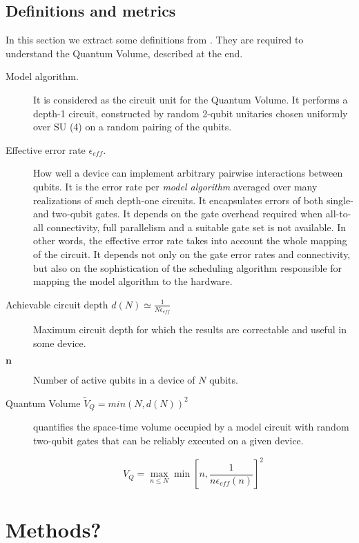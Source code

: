 \documentclass[11pt]{article}
\begin{document}
\subsection{Definitions and metrics}
\label{sec:orgda1eff5}

In this section we extract some definitions from \cite{Bishop_2017,Moll_2018}. 
They are required to understand the Quantum Volume, described at the end.

\begin{description}
\item[{Model algorithm.}] It is considered as the circuit unit for the Quantum Volume. It performs a depth-1 circuit, constructed by random 2-qubit unitaries chosen uniformly over SU (4) on a random pairing of the qubits.

\item[{Effective error rate \(\epsilon_{eff}\).}] How well a device can implement arbitrary pairwise interactions between qubits. It is the error rate per \emph{model algorithm} averaged over many realizations of such depth-one circuits. It encapsulates errors of both single- and two-qubit gates. It depends on the gate overhead required when all-to-all connectivity, full parallelism and a suitable gate set is not available. In other words, the effective error rate takes into account the whole mapping of the circuit. It depends not only on the gate error rates and connectivity, but also on the sophistication of the scheduling algorithm responsible for mapping the model algorithm to the hardware.

\item[{Achievable circuit depth \(d(N) \simeq \frac{1}{N \epsilon_{eff}}\)}] Maximum circuit depth for which the results are correctable and useful in some device.
\end{description}

\begin{description}
\item[{\(\textbf{n}\)}] Number of active qubits in a device of \(N\) qubits.

\item[{Quantum Volume \(\tilde{V}_Q = min (N, d(N))^2\)}] quantifies the space-time volume occupied by a model circuit with random two-qubit gates that can be reliably executed on a given device.

$$V_Q = \max_{n \le N} \min \left[ n,\frac{1}{n \epsilon_{eff} (n)}\right]^2$$
\end{description}

\section{Methods?}
\label{sec:orgc3e0989}
\end{document}
